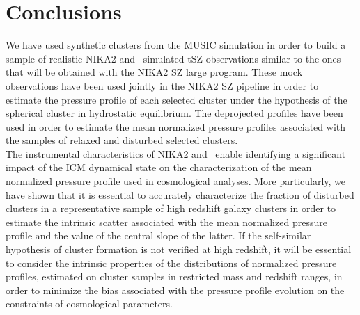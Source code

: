 \documentclass[twocolumn,traditabstract]{aa}
\begin{document}
\section{Conclusions}\label{sec:Conclusions}

We have used synthetic clusters from the MUSIC simulation in order to build a sample of realistic NIKA2 and \planck\ simulated tSZ observations similar to the ones that will be obtained with the NIKA2 SZ large program. These mock observations have been used jointly in the NIKA2 SZ pipeline in order to estimate the pressure profile of each selected cluster under the hypothesis of the spherical cluster in hydrostatic equilibrium. The deprojected profiles have been used in order to estimate the mean normalized pressure profiles associated with the samples of relaxed and disturbed selected clusters.\\

The instrumental characteristics of NIKA2 and \planck\ enable identifying a significant impact of the ICM dynamical state on the characterization of the mean normalized pressure profile used in cosmological analyses. More particularly, we have shown that it is essential to accurately characterize the fraction of disturbed clusters in a representative sample of high redshift galaxy clusters in order to estimate the intrinsic scatter associated with the mean normalized pressure profile and the value of the central slope of the latter. If the self-similar hypothesis of cluster formation is not verified at high redshift, it will be essential to consider the intrinsic properties of the distributions of normalized pressure profiles, estimated on cluster samples in restricted mass and redshift ranges, in order to minimize the bias associated with the pressure profile evolution on the constraints of cosmological parameters.\\
\end{document}
